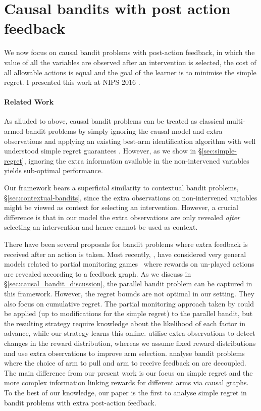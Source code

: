 \documentclass[11pt,a4paper,twoside]{report}
\theoremstyle{plain}
\theoremstyle{definition}
\begin{document}
\section{Causal bandits with post action feedback}
\label{sec:causal-bandit-post-action-feedback}

We now focus on causal bandit problems with post-action feedback, in which the value of all the variables are observed after an intervention is selected, the cost of all allowable actions is equal and the goal of the learner is to minimise the simple regret. I presented this work at NIPS 2016 \citep{NIPS2016_6195}.

\paragraph{Related Work} As alluded to above, causal bandit problems can be treated as classical multi-armed bandit problems by simply ignoring the causal model and extra observations and applying an existing best-arm identification algorithm with well understood simple regret guarantees \citep{Jamieson2013}. However, as we show in \S\ref{sec:simple-regret}, ignoring the extra information available in the non-intervened variables yields sub-optimal performance.

Our framework bears a superficial similarity to contextual bandit problems, \S\ref{sec:contextual-bandits}, since the extra observations on non-intervened variables might be viewed as context for selecting an intervention. 
However, a crucial difference is that in our model the extra observations are only revealed \emph{after} selecting an intervention and hence cannot be used as context. 

There have been several proposals for bandit problems where extra feedback is received after an action is taken.
Most recently, \citet{Alon2015}, \citet{Kocak2014} have considered very general models related to partial monitoring games~\citep{Bartok2014} where rewards on un-played actions are revealed according to a feedback graph. As we discuss in \S\ref{sec:causal_bandit_discussion}, the parallel bandit problem can be captured in this framework. However, the regret bounds are not optimal in our setting. They also focus on cumulative regret. The partial monitoring approach taken by \citet{wu2015online} could be applied (up to modifications for the simple regret) to the parallel bandit, but the resulting strategy require knowledge about the likelihood of each factor in advance, while our strategy learns this online. \citet{Yu2009} utilise extra observations to detect changes in the reward distribution, whereas we assume fixed reward distributions and use extra observations to improve arm selection. \citet{Avner2012} analyse bandit problems where the choice of arm to pull and arm to receive feedback on are decoupled. The main difference from our present work is our focus on simple regret and the more complex information linking rewards for different arms via causal graphs. To the best of our knowledge, our paper is the first to analyse simple regret in bandit problems with extra post-action feedback.
\end{document}
